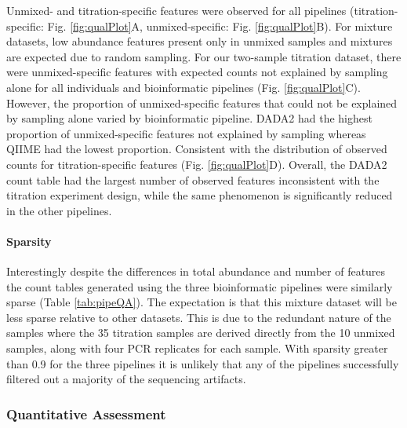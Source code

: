 \documentclass[linenumbers]{bmcart}
\begin{document}
Unmixed- and titration-specific features were observed for all pipelines
(titration-specific: Fig. \ref{fig:qualPlot}A, unmixed-specific: Fig.
\ref{fig:qualPlot}B).
For mixture datasets, low abundance features
present only in unmixed samples and mixtures are expected due to random
sampling. For our two-sample titration dataset, there were
unmixed-specific features with expected counts not explained by sampling
alone for all individuals and bioinformatic pipelines (Fig.
\ref{fig:qualPlot}C). However, the proportion of unmixed-specific
features that could not be explained by sampling alone varied by
bioinformatic pipeline. DADA2 had the highest proportion of
unmixed-specific features not explained by sampling whereas QIIME had
the lowest proportion. Consistent with the distribution of observed
counts for titration-specific features (Fig.
\ref{fig:qualPlot}D). Overall, the DADA2 count table had the largest
number of observed features inconsistent with the titration experiment
design, while the same phenomenon is significantly reduced in the other
pipelines.

\paragraph{Sparsity}
Interestingly despite the differences in total abundance and number of features
the count tables generated using the three bioinformatic pipelines were
similarly sparse (Table \ref{tab:pipeQA}).
The expectation is that this mixture dataset will be
less sparse relative to other datasets. This is due to the redundant
nature of the samples where the 35 titration samples are derived
directly from the 10 unmixed samples, along with four PCR replicates for
each sample. With sparsity greater than 0.9 for the three pipelines it
is unlikely that any of the pipelines successfully filtered out a
majority of the sequencing artifacts.


\subsubsection*{Quantitative Assessment}
\end{document}
